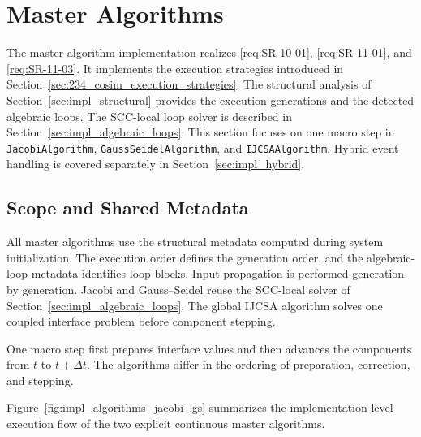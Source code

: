 \section{Master Algorithms}
\label{sec:impl_algorithms}

The master-algorithm implementation realizes \ref{req:SR-10-01}, \ref{req:SR-11-01}, and \ref{req:SR-11-03}.
It implements the execution strategies introduced in Section~\ref{sec:234_cosim_execution_strategies}.
The structural analysis of Section~\ref{sec:impl_structural} provides the execution generations and the detected algebraic loops.
The \ac{SCC}-local loop solver is described in Section~\ref{sec:impl_algebraic_loops}.
This section focuses on one macro step in \texttt{JacobiAlgorithm}, \texttt{GaussSeidelAlgorithm}, and \texttt{IJCSAAlgorithm}.
Hybrid event handling is covered separately in Section~\ref{sec:impl_hybrid}.

\subsection{Scope and Shared Metadata}
\label{sec:impl_algorithms_scope}

All master algorithms use the structural metadata computed during system initialization.
The execution order defines the generation order, and the algebraic-loop metadata identifies loop blocks.
Input propagation is performed generation by generation.
Jacobi and Gauss--Seidel reuse the \ac{SCC}-local solver of Section~\ref{sec:impl_algebraic_loops}.
The global \ac{IJCSA} algorithm solves one coupled interface problem before component stepping.

One macro step first prepares interface values and then advances the components from $t$ to $t+\Delta t$.
The algorithms differ in the ordering of preparation, correction, and stepping.

Figure~\ref{fig:impl_algorithms_jacobi_gs} summarizes the implementation-level execution flow of the two explicit continuous master algorithms.

